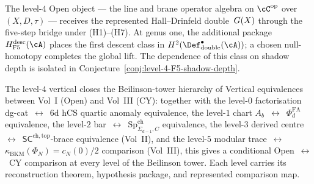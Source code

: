 The level-$4$ Open object — the line and brane operator algebra on
$\cC^{\mathrm{op}}$ over $(X,D,\tau)$ — receives the represented
Hall--Drinfeld double~$G(X)$ through the five-step bridge under
\textup{(H1)--(H7)}.  At genus one, the additional package
$H_{\mathrm{F5}}^{\mathrm{desc}}(\cA)$ places the first descent class
in $H^2(\Def_{\mathrm{double}}^\bullet(\cA))$; a chosen
null-homotopy completes the global lift.  The dependence of this
class on shadow depth is isolated in
Conjecture~\ref{conj:level-4-F5-shadow-depth}.

The level-$4$ vertical closes the Beilinson-tower hierarchy of
Vertical equivalences between Vol~I (Open) and Vol~III (CY): together
with the level-$0$ factorisation dg-cat~$\leftrightarrow$~6d hCS
quartic anomaly equivalence, the level-$1$ chart $A_b$~$\leftrightarrow$~$\Phi_d^{\mathrm{FA}}$ equivalence, the level-$2$
bar~$\leftrightarrow$~$\mathrm{Sp}^{\mathrm{ch}}_{\Sigma_{d-1}, C}$
equivalence, the level-$3$ derived centre~$\leftrightarrow$~$\mathsf{SC}^{\mathrm{ch,top}}$-brace equivalence (Vol~II), and the
level-$5$ modular trace~$\leftrightarrow$~$\kappa_{\mathrm{BKM}}(\Phi_N) = c_N(0)/2$ comparison (Vol~III), this gives a conditional
Open~$\leftrightarrow$~CY comparison at every level of the Beilinson
tower.  Each level carries its reconstruction theorem, hypothesis
package, and represented comparison map.
